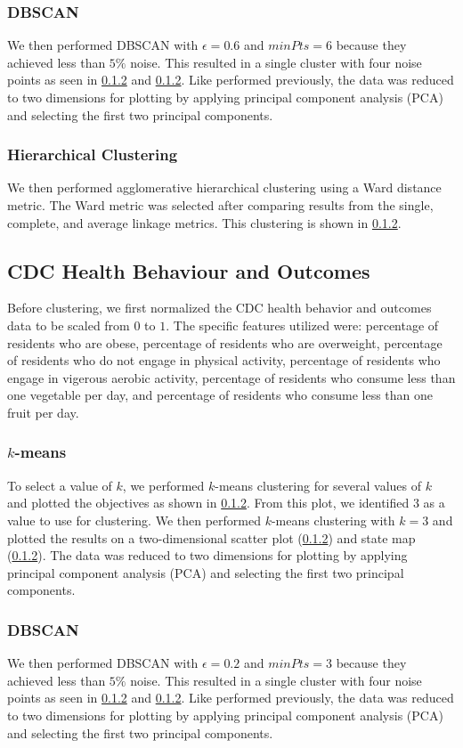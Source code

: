 \documentclass{article}
\begin{document}
\subsubsection{DBSCAN}
We then performed DBSCAN with $\epsilon = 0.6$ and $minPts = 6$ because they achieved less than $5\%$ noise. This resulted in a single cluster with four noise points as seen in \ref{} and \ref{}. Like performed previously, the data was reduced to two dimensions for plotting by applying principal component analysis (PCA) and selecting the first two principal components.

\subsubsection{Hierarchical Clustering}
We then performed agglomerative hierarchical clustering using a Ward distance metric. The Ward metric was selected after comparing results from the single, complete, and average linkage metrics. This clustering is shown in \ref{}.

\subsection{CDC Health Behaviour and Outcomes}
Before clustering, we first normalized the CDC health behavior and outcomes data to be scaled from $0$ to $1$. The specific features utilized were: percentage of residents who are obese, percentage of residents who are overweight, percentage of residents who do not engage in physical activity, percentage of residents who engage in vigerous aerobic activity, percentage of residents who consume less than one vegetable per day, and percentage of residents who consume less than one fruit per day.

\subsubsection{$k$-means}
To select a value of $k$, we performed $k$-means clustering for several values of $k$ and plotted the objectives as shown in \ref{}. From this plot, we identified $3$ as a value to use for clustering. We then performed $k$-means clustering with $k=3$ and plotted the results on a two-dimensional scatter plot (\ref{}) and state map (\ref{}). The data was reduced to two dimensions for plotting by applying principal component analysis (PCA) and selecting the first two principal components.

\subsubsection{DBSCAN}
We then performed DBSCAN with $\epsilon = 0.2$ and $minPts = 3$ because they achieved less than $5\%$ noise. This resulted in a single cluster with four noise points as seen in \ref{} and \ref{}. Like performed previously, the data was reduced to two dimensions for plotting by applying principal component analysis (PCA) and selecting the first two principal components.
\end{document}
